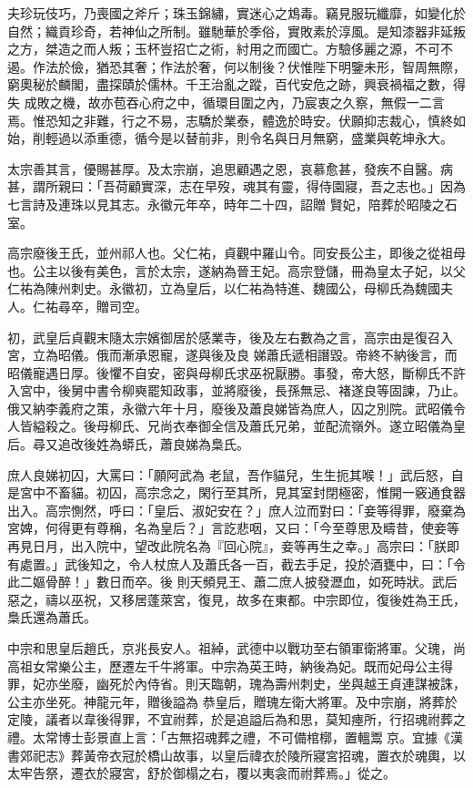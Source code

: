 \begin{pinyinscope}
 夫珍玩伎巧，乃喪國之斧斤；珠玉錦繡，實迷心之鴆毒。竊見服玩纖靡，如變化於自然；織貢珍奇，若神仙之所制。雖馳華於季俗，實敗素於淳風。是知漆器非延叛之方，桀造之而人叛；玉杯豈招亡之術，紂用之而國亡。方驗侈麗之源，不可不遏。作法於儉，猶恐其奢；作法於奢，何以制後？伏惟陛下明鑒未形，智周無際，窮奧秘於麟閣，盡探賾於儒林。千王治亂之蹤，百代安危之跡，興衰禍福之數，得失
 成敗之機，故亦苞吞心府之中，循環目圍之內，乃宸衷之久察，無假一二言焉。惟恐知之非難，行之不易，志驕於業泰，體逸於時安。伏願抑志裁心，慎終如始，削輕過以添重德，循今是以替前非，則令名與日月無窮，盛業與乾坤永大。



 太宗善其言，優賜甚厚。及太宗崩，追思顧遇之恩，哀慕愈甚，發疾不自醫。病甚，謂所親曰：「吾荷顧實深，志在早歿，魂其有靈，得侍園寢，吾之志也。」因為七言詩及連珠以見其志。永徽元年卒，時年二十四，詔贈
 賢妃，陪葬於昭陵之石室。



 高宗廢後王氏，並州祁人也。父仁祐，貞觀中羅山令。同安長公主，即後之從祖母也。公主以後有美色，言於太宗，遂納為晉王妃。高宗登儲，冊為皇太子妃，以父仁祐為陳州刺史。永徽初，立為皇后，以仁祐為特進、魏國公，母柳氏為魏國夫人。仁祐尋卒，贈司空。



 初，武皇后貞觀末隨太宗嬪御居於感業寺，後及左右數為之言，高宗由是復召入宮，立為昭儀。俄而漸承恩寵，遂與後及良
 娣蕭氏遞相譖毀。帝終不納後言，而昭儀寵遇日厚。後懼不自安，密與母柳氏求巫祝厭勝。事發，帝大怒，斷柳氏不許入宮中，後舅中書令柳奭罷知政事，並將廢後，長孫無忌、褚遂良等固諫，乃止。俄又納李義府之策，永徽六年十月，廢後及蕭良娣皆為庶人，囚之別院。武昭儀令人皆縊殺之。後母柳氏、兄尚衣奉御全信及蕭氏兄弟，並配流嶺外。遂立昭儀為皇后。尋又追改後姓為蟒氏，蕭良娣為梟氏。



 庶人良娣初囚，大罵曰：「願阿武為
 老鼠，吾作貓兒，生生扼其喉！」武后怒，自是宮中不畜貓。初囚，高宗念之，閑行至其所，見其室封閉極密，惟開一竅通食器出入。高宗惻然，呼曰：「皇后、淑妃安在？」庶人泣而對曰：「妾等得罪，廢棄為宮婢，何得更有尊稱，名為皇后？」言訖悲咽，又曰：「今至尊思及疇昔，使妾等再見日月，出入院中，望改此院名為『回心院』，妾等再生之幸。」高宗曰：「朕即有處置。」武後知之，令人杖庶人及蕭氏各一百，截去手足，投於酒甕中，曰：「令此二嫗骨醉！」數日而卒。後
 則天頻見王、蕭二庶人披發瀝血，如死時狀。武后惡之，禱以巫祝，又移居蓬萊宮，復見，故多在東都。中宗即位，復後姓為王氏，梟氏還為蕭氏。



 中宗和思皇后趙氏，京兆長安人。祖綽，武德中以戰功至右領軍衛將軍。父瑰，尚高祖女常樂公主，歷遷左千牛將軍。中宗為英王時，納後為妃。既而妃母公主得罪，妃亦坐廢，幽死於內侍省。則天臨朝，瑰為壽州刺史，坐與越王貞連謀被誅，公主亦坐死。神龍元年，贈後謚為
 恭皇后，贈瑰左衛大將軍。及中宗崩，將葬於定陵，議者以韋後得罪，不宜祔葬，於是追謚后為和思，莫知瘞所，行招魂祔葬之禮。太常博士彭景直上言：「古無招魂葬之禮，不可備棺槨，置轀鬻京。宜據《漢書郊祀志》葬黃帝衣冠於橋山故事，以皇后禕衣於陵所寢宮招魂，置衣於魂輿，以太牢告祭，遷衣於寢宮，舒於御榻之右，覆以夷衾而祔葬焉。」從之。




\end{pinyinscope}

